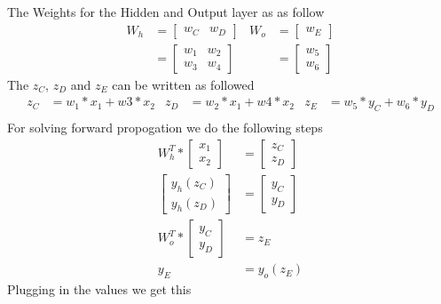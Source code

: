 \documentclass[12pt,english]{article}
\begin{document}
The Weights for the Hidden and Output layer as as follow
\begin{align*} 
W_h &= \begin{bmatrix} w_C & w_D \end{bmatrix} &
W_o &= \begin{bmatrix} w_E  \end{bmatrix} \\
&= \begin{bmatrix} w_1 & w_2 \\ w_3 & w_4 \end{bmatrix} &
&= \begin{bmatrix} w_5 \\ w_6 \end{bmatrix}
\end{align*}
The $z_C$, $z_D$ and $z_E$ can be written as followed
\begin{align*} 
z_C &= w_1 * x_1 +w3 * x_2 &
z_D &= w_2 * x_1 +w4 * x_2 &
z_E &= w_5 * y_C + w_6 * y_D \\
\end{align*}
For  solving forward propogation we do the following steps
\begin{align}
W^T_h * \begin{bmatrix} x_1 \\ x_2 \end{bmatrix}  &= \begin{bmatrix} z_C \\ z_D \end{bmatrix} \\
\begin{bmatrix} y_h(z_C) \\ y_h(z_D) \end{bmatrix} &= \begin{bmatrix} y_C \\ y_D \end{bmatrix} \\
W^T_o * \begin{bmatrix} y_C \\ y_D \end{bmatrix} &=z_E\\
y_E &= y_o(z_E)
\end{align}
Plugging in the values we get this
\end{document}

